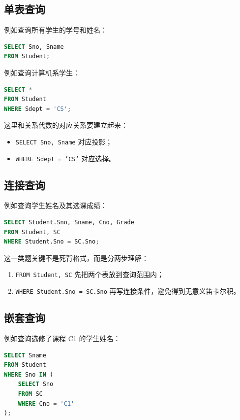 \documentclass{../../note}
\begin{document}
\subsection{单表查询}

例如查询所有学生的学号和姓名：

\begin{lstlisting}[language=SQL]
SELECT Sno, Sname
FROM Student;
\end{lstlisting}

例如查询计算机系学生：

\begin{lstlisting}[language=SQL]
SELECT *
FROM Student
WHERE Sdept = 'CS';
\end{lstlisting}

这里和关系代数的对应关系要建立起来：

\begin{itemize}
  \item \texttt{SELECT Sno, Sname} 对应投影；
  \item \texttt{WHERE Sdept = 'CS'} 对应选择。
\end{itemize}

\subsection{连接查询}

例如查询学生姓名及其选课成绩：

\begin{lstlisting}[language=SQL]
SELECT Student.Sno, Sname, Cno, Grade
FROM Student, SC
WHERE Student.Sno = SC.Sno;
\end{lstlisting}

这一类题关键不是死背格式，而是分两步理解：

\begin{enumerate}
  \item \texttt{FROM Student, SC} 先把两个表放到查询范围内；
  \item \texttt{WHERE Student.Sno = SC.Sno} 再写连接条件，避免得到无意义笛卡尔积。
\end{enumerate}

\subsection{嵌套查询}

例如查询选修了课程 C1 的学生姓名：

\begin{lstlisting}[language=SQL]
SELECT Sname
FROM Student
WHERE Sno IN (
    SELECT Sno
    FROM SC
    WHERE Cno = 'C1'
);
\end{lstlisting}
\end{document}
